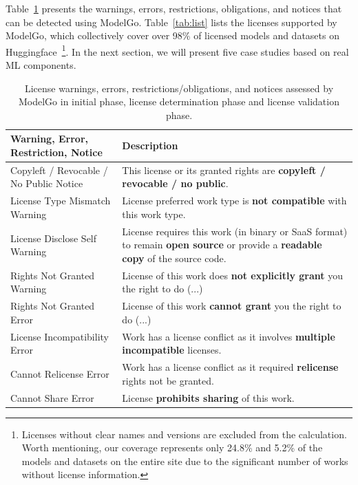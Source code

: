 Table~\ref{tab:analysis} presents the warnings, errors, restrictions, obligations, and notices that can be detected using ModelGo.
Table~\ref{tab:list} lists the licenses supported by ModelGo, which collectively cover over 98\% of licensed models and datasets on Huggingface~\footnote{Licenses without clear names and versions are excluded from the calculation. Worth mentioning, our coverage represents only 24.8\% and 5.2\% of the models and datasets on the entire site due to the significant number of works without license information.}.
In the next section, we will present five case studies based on real ML components.


\begin{table}[t]
    \caption{License warnings, errors, restrictions/obligations, and notices assessed by ModelGo in \textcolor{Permissive}{initial phase}, \textcolor{Copyleft}{license determination phase} and license validation phase.}
    \scriptsize
    \label{tab:analysis}
    \begin{tabular}{|p{3.3cm}|p{4.3cm}|}

    \hline
    \rowcolor[gray]{.8}
    \textbf{Warning, Error, Restriction, Notice} & \textbf{Description} \\ \hline
    
    \textcolor{Permissive}{Copyleft / Revocable / No Public Notice} & This license or its granted rights are \textbf{copyleft / revocable / no public}. \\ \hline \hline
    
    \textcolor{Permissive}{License Type Mismatch Warning} & License preferred work type is \textbf{not compatible} with this work type. \\ \hline
    License Disclose Self Warning & License requires this work (in binary or SaaS format) to remain \textbf{open source} or provide a \textbf{readable copy} of the source code. \\ \hline
    Rights Not Granted Warning & License of this work does \textbf{not explicitly grant} you the right to do (...) \\ \hline \hline
    
    
    Rights Not Granted Error & License of this work \textbf{cannot grant} you the right to do (...) \\ \hline
    \textcolor{Copyleft}{License Incompatibility Error} & Work has a license conflict as it involves \textbf{multiple incompatible} licenses. \\ \hline
    \textcolor{Copyleft}{Cannot Relicense Error} & Work has a license conflict as it required \textbf{relicense} rights not be granted. \\ \hline
    Cannot Share Error & License \textbf{prohibits sharing} of this work. \\ \hline \hline


\end{tabular}
\end{table}
